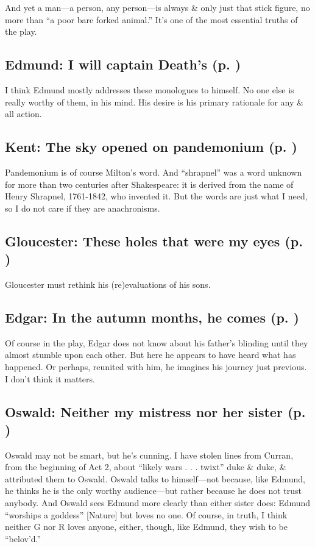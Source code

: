 And yet a man---a person, any person---is always \& only just that stick figure, no more than ``a poor bare forked animal.'' It's one of the most essential truths of the play.

\subsection{Edmund: I will captain Death's (p. \pageref{ch:lear_bb})}
I think Edmund mostly addresses these monologues to himself. No one else is really worthy of them, in his mind. His desire is his primary rationale for any \& all action.

\subsection{Kent: The sky opened on pandemonium (p. \pageref{ch:lear_bc})}
Pandemonium is of course Milton's word. And ``shrapnel'' was a word unknown for more than two centuries after Shakespeare: it is derived from the name of Henry Shrapnel, 1761-1842, who invented it. But the words are just what I need, so I do not care if they are anachronisms.

\subsection{Gloucester: These holes that were my eyes (p. \pageref{ch:lear_bd})}
Gloucester must rethink his (re)evaluations of his sons.

\subsection{Edgar: In the autumn months, he comes (p. \pageref{ch:lear_be})}
Of course in the play, Edgar does not know about his father's blinding until they almost stumble upon each other. But here he appears to have heard what has happened. Or perhaps, reunited with him, he imagines his journey just previous. I don't think it matters.

\subsection{Oswald: Neither my mistress nor her sister (p. \pageref{ch:lear_bf})}
Oswald may not be smart, but he's cunning. I have stolen lines from Curran, from the beginning of Act 2, about ``likely wars . . . twixt'' duke \& duke, \& attributed them to Oswald. Oswald talks to himself---not because, like Edmund, he thinks he is the only worthy audience---but rather because he does not trust anybody. And Oswald sees Edmund more clearly than either sister does: Edmund ``worships a goddess'' {[}Nature{]} but loves no one. Of course, in truth, I think neither G nor R loves anyone, either, though, like Edmund, they wish to be ``belov'd.''


